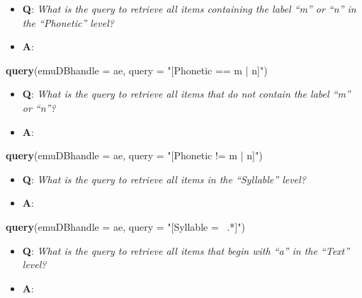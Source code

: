 \documentclass[]{book}
\newenvironment{Shaded}{\begin{snugshade}}{\end{snugshade}}
\newcommand{\DataTypeTok}[1]{\textcolor[rgb]{0.13,0.29,0.53}{#1}}
\newcommand{\KeywordTok}[1]{\textcolor[rgb]{0.13,0.29,0.53}{\textbf{#1}}}
\newcommand{\NormalTok}[1]{#1}
\newcommand{\StringTok}[1]{\textcolor[rgb]{0.31,0.60,0.02}{#1}}
\providecommand{\tightlist}{%
  \setlength{\itemsep}{0pt}\setlength{\parskip}{0pt}}
\begin{document}
\begin{itemize}
\tightlist
\item
  \textbf{Q}: \emph{What is the query to retrieve all items containing the label ``m'' or ``n'' in the ``Phonetic'' level?}
\item
  \textbf{A}:
\end{itemize}

\begin{Shaded}
\begin{Highlighting}[]
\KeywordTok{query}\NormalTok{(}\DataTypeTok{emuDBhandle =}\NormalTok{ ae, }
      \DataTypeTok{query =} \StringTok{"[Phonetic == m | n]"}\NormalTok{)}
\end{Highlighting}
\end{Shaded}

\begin{itemize}
\tightlist
\item
  \textbf{Q}: \emph{What is the query to retrieve all items that do not contain the label ``m'' or ``n''?}
\item
  \textbf{A}:
\end{itemize}

\begin{Shaded}
\begin{Highlighting}[]
\KeywordTok{query}\NormalTok{(}\DataTypeTok{emuDBhandle =}\NormalTok{ ae, }
      \DataTypeTok{query =} \StringTok{"[Phonetic != m | n]"}\NormalTok{)}
\end{Highlighting}
\end{Shaded}

\begin{itemize}
\tightlist
\item
  \textbf{Q}: \emph{What is the query to retrieve all items in the ``Syllable'' level?}
\item
  \textbf{A}:
\end{itemize}

\begin{Shaded}
\begin{Highlighting}[]
\KeywordTok{query}\NormalTok{(}\DataTypeTok{emuDBhandle =}\NormalTok{ ae, }
      \DataTypeTok{query =} \StringTok{"[Syllable =~ .*]"}\NormalTok{)}
\end{Highlighting}
\end{Shaded}

\begin{itemize}
\tightlist
\item
  \textbf{Q}: \emph{What is the query to retrieve all items that begin with ``a'' in the ``Text'' level?}
\item
  \textbf{A}:
\end{itemize}
\end{document}
